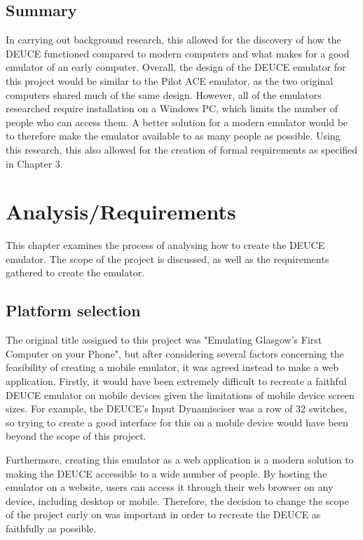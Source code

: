 \documentclass{l4proj}
\begin{document}
\section{Summary}
In carrying out background research, this allowed for the discovery of how the DEUCE functioned compared to modern computers and what makes for a good emulator of an early computer. Overall, the design of the DEUCE emulator for this project would be similar to the Pilot ACE emulator, as the two original computers shared much of the same design. However, all of the emulators researched require installation on a Windows PC, which limits the number of people who can access them. A better solution for a modern emulator would be to therefore make the emulator available to as many people as possible. Using this research, this also allowed for the creation of formal requirements as specified in Chapter 3.

\chapter{Analysis/Requirements}
This chapter examines the process of analysing how to create the DEUCE emulator. The scope of the project is discussed, as well as the requirements gathered to create the emulator.

\section{Platform selection}
The original title assigned to this project was "Emulating Glasgow's First Computer on your Phone", but after considering several factors concerning the feasibility of creating a mobile emulator, it was agreed instead to make a web application. Firstly, it would have been extremely difficult to recreate a faithful DEUCE emulator on mobile devices given the limitations of mobile device screen sizes. For example, the DEUCE's Input Dynamisciser was a row of 32 switches, so trying to create a good interface for this on a mobile device would have been beyond the scope of this project.

Furthermore, creating this emulator as a web application is a modern solution to making the DEUCE accessible to a wide number of people. By hosting the emulator on a website, users can access it through their web browser on any device, including desktop or mobile. Therefore, the decision to change the scope of the project early on was important in order to recreate the DEUCE as faithfully as possible.
\end{document}
